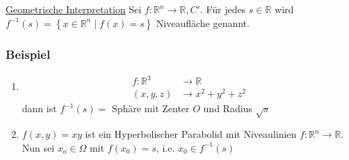 \noindent \underline{Geometrische Interpretation}
Sei $f:\mathbb{R}^n\rightarrow\mathbb{R}, C'$. Für jedes $s\in\mathbb{R}$ wird $f^{-1}(s)=\left\{ x\in\mathbb{R}^n\mid f(x)=s\right\}$ Niveaufläche genannt.

\subsubsection*{Beispiel}
\begin{enumerate}
    \item \begin{align*}
 f:\mathbb{R}^3 &\rightarrow\mathbb{R}\\
 \left( x,y,z\right) &\rightarrow x^2 +y^2 +z^2
 \end{align*}
dann ist $f^{-1}(s)=$ Sphäre mit Zenter $O$ und Radius $\sqrt{s}$
\item $f\left( x,y\right) = xy$ ist ein Hyperbolischer Parabolid mit Niveaulinien  $f:\mathbb{R}^n \rightarrow\mathbb{R}$. Nun sei $x_o\in\Omega$ mit $f\left( x_0\right) = s$, i.e. $x_0 \in f^{-1} (s)$
\end{enumerate}
